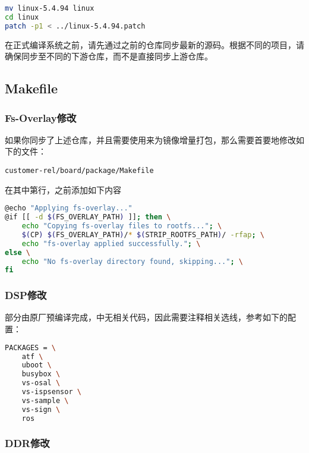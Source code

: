\documentclass[UTF8]{ctexart}
\begin{document}
\begin{lstlisting}[language=sh]
mv linux-5.4.94 linux
cd linux
patch -p1 < ../linux-5.4.94.patch
\end{lstlisting}

在正式编译系统之前，请先通过之前的仓库同步最新的源码。根据不同的项目，请确保同步至不同的下游仓库，而不是直接同步上游仓库。

\subsection{Makefile}

\subsubsection{Fs-Overlay修改}

如果你同步了上述仓库，并且需要使用来为镜像增量打包，那么需要首要地修改如下的文件：

\begin{lstlisting}
customer-rel/board/package/Makefile
\end{lstlisting}

在其中第行，之前添加如下内容

\begin{lstlisting}[language=sh]
@echo "Applying fs-overlay..."
@if [[ -d $(FS_OVERLAY_PATH) ]]; then \
    echo "Copying fs-overlay files to rootfs..."; \
    $(CP) $(FS_OVERLAY_PATH)/* $(STRIP_ROOTFS_PATH)/ -rfap; \
    echo "fs-overlay applied successfully."; \
else \
    echo "No fs-overlay directory found, skipping..."; \
fi
\end{lstlisting}

\subsubsection{DSP修改}

\text{DSP}部分由原厂预编译完成，\text{SDK}中无相关代码，因此需要注释相关选线，参考如下的配置：

\begin{lstlisting}[language=sh]
PACKAGES = \
	atf \
	uboot \
	busybox \
	vs-osal \
	vs-ispsensor \
	vs-sample \
	vs-sign \
	ros
\end{lstlisting}

\subsubsection{DDR修改}
\end{document}
